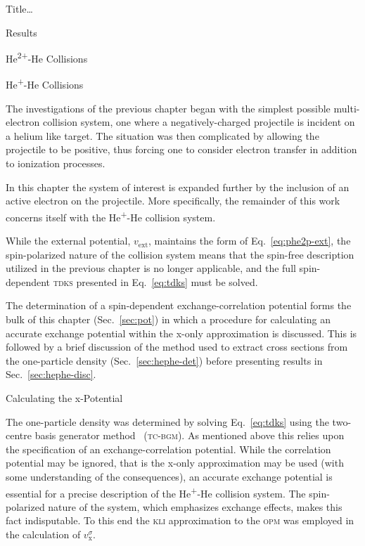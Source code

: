 \documentclass[letterpaper, 11 pt]{report}
\begin{document}
\begin{chapter}{ Title\dots \label{chap:p-he2p-he}}
\begin{section}{Results \label{sec:phe2p-res}}
\begin{subsection}{\texorpdfstring{He\textsuperscript{2+}}{He2+}-He Collisions 
                         \label{sec:he2phe-res}}
      \end{subsection}

   \end{section}

\end{chapter}

\begin{chapter}{\texorpdfstring{He\textsuperscript{+}}{He+}-He Collisions \label{chap:hephe}}

   The investigations of the previous chapter began with the simplest possible multi-electron collision
   system, one where a negatively-charged projectile is incident on a helium like target. The situation
   was then complicated by allowing the projectile to be positive, thus forcing one to consider electron
   transfer in addition to ionization processes.

   In this chapter the system of interest is expanded further by the inclusion of an active electron on
   the projectile. More specifically, the remainder of this work concerns itself with the
   He\textsuperscript{+}-He collision system.

   While the external potential, $v_\mathrm{ext}$, maintains the form of Eq.~\eqref{eq:phe2p-ext}, the
   spin-polarized nature of the collision system means that the spin-free description utilized in the
   previous chapter is no longer applicable, and the full spin-dependent \textsc{tdks} presented in
   Eq.~\eqref{eq:tdks} must be solved.

   The determination of a spin-dependent exchange-correlation potential forms the bulk of this chapter
   (Sec.~\ref{sec:pot}) in which a procedure for calculating an accurate exchange potential within the
   x-only approximation is discussed. This is followed by a brief discussion of the method used to
   extract cross sections from the one-particle density (Sec.~\ref{sec:hephe-det}) before presenting
   results in Sec.~\ref{sec:hephe-disc}.

   \begin{section}{Calculating the x-Potential \label{sec:pot}}

      The one-particle density was determined by solving Eq.~\eqref{eq:tdks} using the two-centre basis
      generator method~\cite{tcbgm} (\textsc{tc-bgm}). As mentioned above this relies upon the
      specification of an exchange-correlation potential. While the correlation potential may be
      ignored, that is the x-only approximation may be used (with some understanding of the
      consequences), an accurate exchange potential is essential for a precise description of the
      He\textsuperscript{+}-He collision system. The spin-polarized nature of the system, which
      emphasizes exchange effects, makes this fact indisputable. To this end the \textsc{kli}
      approximation to the \textsc{opm} was employed in the calculation of $v^\sigma_\mathrm{x}$.


\end{section}
\end{chapter}
\end{document}
